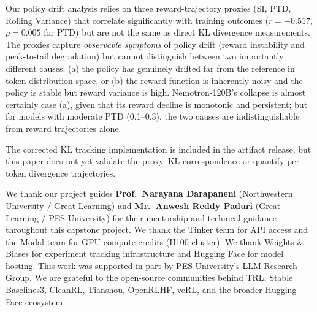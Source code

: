\documentclass{article}
\begin{document}
Our policy drift analysis relies on three reward-trajectory proxies (SI, PTD,
Rolling Variance) that correlate significantly with training outcomes
($r = -0.517$, $p = 0.005$ for PTD) but are not the same as direct KL
divergence measurements.
The proxies capture \emph{observable symptoms} of policy drift (reward
instability and peak-to-tail degradation) but cannot distinguish between
two importantly different causes: (a) the policy has genuinely drifted far from
the reference in token-distribution space, or (b) the reward function is
inherently noisy and the policy is stable but reward variance is high.
Nemotron-120B's collapse is almost certainly case (a), given that its reward
decline is monotonic and persistent; but for models with moderate PTD (0.1--0.3),
the two causes are indistinguishable from reward trajectories alone.

The corrected KL tracking implementation is included in the artifact release,
but this paper does not yet validate the proxy--KL correspondence or quantify
per-token divergence trajectories.





\begin{ack}
\label{sec:acknowledgments}
We thank our project guides \textbf{Prof.~Narayana Darapaneni}
(Northwestern University / Great Learning) and
\textbf{Mr.~Anwesh Reddy Paduri} (Great Learning / PES University)
for their mentorship and technical guidance throughout this capstone project.
We thank the Tinker team for API access and the Modal team for GPU compute credits
(H100 cluster). We thank Weights \& Biases for experiment tracking infrastructure
and Hugging Face for model hosting. This work was supported in part by PES
University's LLM Research Group. We are grateful to the open-source communities
behind TRL, Stable Baselines3, CleanRL, Tianshou, OpenRLHF, veRL, and the
broader Hugging Face ecosystem.
\end{ack}





\appendix
\renewcommand{\thesection}{A\arabic{section}}
\end{document}
